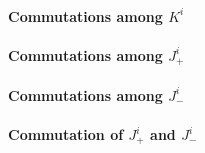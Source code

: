 \documentclass[11pt, english, fleqn, DIV=15, headinclude, BCOR=1cm]{scrartcl}
\begin{document}
\paragraph{Commutations among $K^i$}


\paragraph{Commutations among $J_+^i$}


\paragraph{Commutations among $J_-^i$}


\paragraph{Commutation of $J_+^i$ and $J_-^i$}
\end{document}
